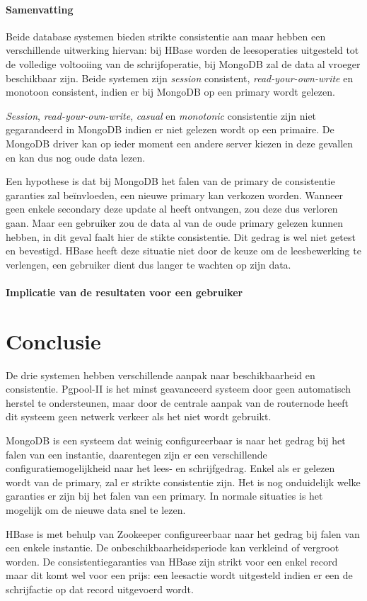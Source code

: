 \paragraph{Samenvatting} Beide database systemen bieden strikte consistentie aan maar hebben een verschillende uitwerking hiervan: bij HBase worden de leesoperaties uitgesteld tot de volledige voltooiing van de schrijfoperatie, bij MongoDB zal de data al vroeger beschikbaar zijn. Beide systemen zijn \textit{session} consistent, \textit{read-your-own-write} en monotoon consistent, indien er bij MongoDB op een primary wordt gelezen.  

\textit{Session}, \textit{read-your-own-write}, \textit{casual} en \textit{monotonic} consistentie zijn niet gegarandeerd in MongoDB indien er niet gelezen wordt op een primaire. De MongoDB driver kan op ieder moment een andere server kiezen in deze gevallen en kan dus nog oude data lezen. 

Een hypothese is dat bij MongoDB het falen van de primary de consistentie garanties zal beïnvloeden, een nieuwe primary kan verkozen worden. Wanneer geen enkele secondary deze update al heeft ontvangen, zou deze dus verloren gaan. Maar een gebruiker zou de data al van de oude primary gelezen kunnen hebben, in dit geval faalt hier de stikte consistentie. Dit gedrag is wel niet getest en bevestigd. HBase heeft deze situatie niet door de keuze om de leesbewerking te verlengen, een gebruiker dient dus langer te wachten op zijn data. 

\paragraph{Implicatie van de resultaten voor een gebruiker} 

\section{Conclusie}
De drie systemen hebben verschillende aanpak naar beschikbaarheid en consistentie. Pgpool-II is het minst geavanceerd systeem door geen automatisch herstel te ondersteunen, maar door de centrale aanpak van de routernode heeft dit systeem geen netwerk verkeer als het niet wordt gebruikt. 

MongoDB is een systeem dat weinig configureerbaar is naar het gedrag bij het falen van een instantie, daarentegen zijn er een verschillende configuratiemogelijkheid naar het lees- en schrijfgedrag. Enkel als er gelezen wordt van de primary, zal er strikte consistentie zijn. Het is nog onduidelijk welke garanties er zijn bij het falen van een primary. In normale situaties is het mogelijk om de nieuwe data snel te lezen. 

HBase is met behulp van Zookeeper configureerbaar naar het gedrag bij falen van een enkele instantie. De onbeschikbaarheidsperiode kan verkleind of vergroot worden. De consistentiegaranties van HBase zijn strikt voor een enkel record maar dit komt wel voor een prijs: een leesactie wordt uitgesteld indien er een de schrijfactie op dat record uitgevoerd wordt. 